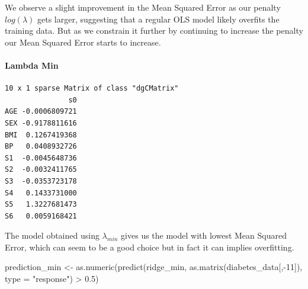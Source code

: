 \documentclass[
]{article}
\newenvironment{Shaded}{\begin{snugshade}}{\end{snugshade}}
\newcommand{\AttributeTok}[1]{\textcolor[rgb]{0.77,0.63,0.00}{#1}}
\newcommand{\DecValTok}[1]{\textcolor[rgb]{0.00,0.00,0.81}{#1}}
\newcommand{\FloatTok}[1]{\textcolor[rgb]{0.00,0.00,0.81}{#1}}
\newcommand{\FunctionTok}[1]{\textcolor[rgb]{0.00,0.00,0.00}{#1}}
\newcommand{\NormalTok}[1]{#1}
\newcommand{\OtherTok}[1]{\textcolor[rgb]{0.56,0.35,0.01}{#1}}
\newcommand{\SpecialCharTok}[1]{\textcolor[rgb]{0.00,0.00,0.00}{#1}}
\newcommand{\StringTok}[1]{\textcolor[rgb]{0.31,0.60,0.02}{#1}}
\begin{document}
We observe a slight improvement in the Mean Squared Error as our penalty
\(log(\lambda)\) gets larger, suggesting that a regular OLS model likely
overfits the training data. But as we constrain it further by continuing
to increase the penalty our Mean Squared Error starts to increase.

\hypertarget{lambda-min}{%
\paragraph{Lambda Min}\label{lambda-min}}

\begin{Shaded}
\end{Shaded}

\begin{verbatim}
10 x 1 sparse Matrix of class "dgCMatrix"
               s0
AGE -0.0006809721
SEX -0.9178811616
BMI  0.1267419368
BP   0.0408932726
S1  -0.0045648736
S2  -0.0032411765
S3  -0.0353723178
S4   0.1433731000
S5   1.3227681473
S6   0.0059168421
\end{verbatim}

The model obtained using \(\lambda_{min}\) gives us the model with
lowest Mean Squared Error, which can seem to be a good choice but in
fact it can implies overfitting.

\begin{Shaded}
\begin{Highlighting}[]
\NormalTok{prediction\_min }\OtherTok{\textless{}{-}} \FunctionTok{as.numeric}\NormalTok{(}\FunctionTok{predict}\NormalTok{(ridge\_min, }\FunctionTok{as.matrix}\NormalTok{(diabetes\_data[,}\SpecialCharTok{{-}}\DecValTok{11}\NormalTok{]), }\AttributeTok{type =} \StringTok{"response"}\NormalTok{) }\SpecialCharTok{\textgreater{}} \FloatTok{0.5}\NormalTok{)}
\end{Highlighting}
\end{Shaded}
\end{document}
